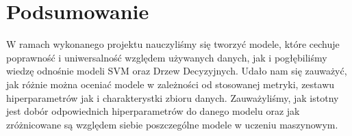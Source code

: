 \documentclass[
    left=2.5cm,         %
    right=2.5cm,        %
    top=2.5cm,          %
    bottom=3cm,         %
    bindingoffset=6mm,  %
    nohyphenation=false %
]{eiti/eiti-report}
\begin{document}
\section{Podsumowanie}
W ramach wykonanego projektu nauczyliśmy się tworzyć modele, które cechuje poprawność i uniwersalność względem używanych danych, jak i pogłębiliśmy wiedzę odnośnie modeli SVM oraz Drzew Decyzyjnych. Udało nam się zauważyć, jak różnie można oceniać modele w zależności od stosowanej metryki, zestawu hiperparametrów jak i charakterystki zbioru danych. Zauważyliśmy, jak istotny jest dobór odpowiednich hiperparametrów do danego modelu oraz jak zróżnicowane są względem siebie poszczególne modele w uczeniu maszynowym. 
\clearpage
\printbibliography





\end{document}
